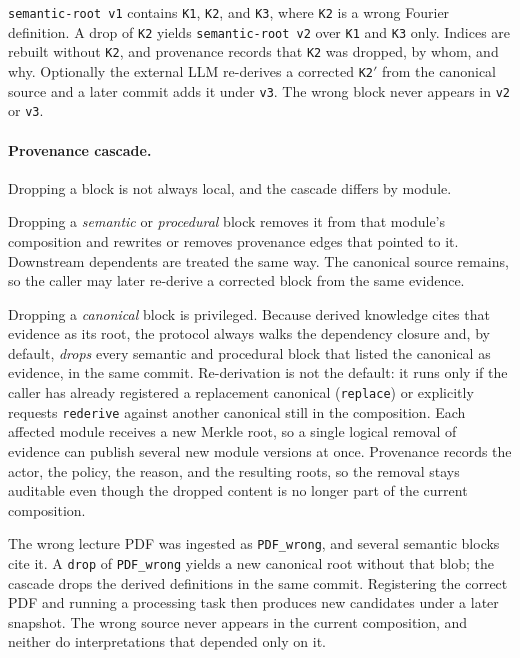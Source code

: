 \documentclass[11pt,a4paper]{article}
\begin{document}
\begin{callout}[title=Example]
\texttt{semantic-root v1} contains \texttt{K1}, \texttt{K2}, and \texttt{K3},
where \texttt{K2} is a wrong Fourier definition. A drop of \texttt{K2} yields
\texttt{semantic-root v2} over \texttt{K1} and \texttt{K3} only. Indices are
rebuilt without \texttt{K2}, and provenance records that \texttt{K2} was
dropped, by whom, and why. Optionally the external LLM re-derives a corrected
\texttt{K2$'$} from the canonical source and a later commit adds it under
\texttt{v3}. The wrong block never appears in \texttt{v2} or \texttt{v3}.
\end{callout}

\paragraph{Provenance cascade.}
Dropping a block is not always local, and the cascade differs by module.

Dropping a \emph{semantic} or \emph{procedural} block removes it from that
module's composition and rewrites or removes provenance edges that pointed to
it. Downstream dependents are treated the same way. The canonical source
remains, so the caller may later re-derive a corrected block from the same
evidence.

Dropping a \emph{canonical} block is privileged. Because derived knowledge
cites that evidence as its root, the protocol always walks the dependency
closure and, by default, \emph{drops} every semantic and procedural block that
listed the canonical as evidence, in the same commit. Re-derivation is not the
default: it runs only if the caller has already registered a replacement
canonical (\texttt{replace}) or explicitly requests \texttt{rederive} against
another canonical still in the composition. Each affected module receives a new
Merkle root, so a single logical removal of evidence can publish several new
module versions at once. Provenance records the actor, the policy, the reason,
and the resulting roots, so the removal stays auditable even though the dropped
content is no longer part of the current composition.

\begin{callout}[title=Example]
The wrong lecture PDF was ingested as \texttt{PDF\_wrong}, and several semantic
blocks cite it. A \texttt{drop} of \texttt{PDF\_wrong} yields a new canonical
root without that blob; the cascade drops the derived definitions in the same
commit. Registering the correct PDF and running a processing task then produces
new candidates under a later snapshot. The wrong source never appears in the
current composition, and neither do interpretations that depended only on it.
\end{callout}
\end{document}
